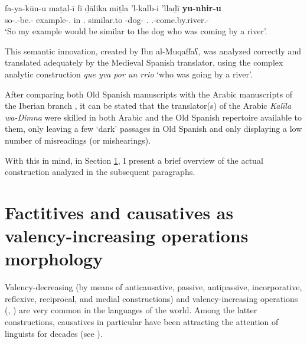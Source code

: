 \documentclass[output=paper]{langscibook}
\begin{document}
\begin{exe}
    \ex\label{doehla:ex:2}
    \gll fa-ya-kūn-u maṯal-ī fī ḏālika miṯla 'l-kalb-i 'llaḏī {\textbf{yu-nhir-u}\footnotemark[12]} \\
    so-\Third\SG.\M-be.\IPFV-\IND{} example-\POSS.\First\SG{} in \DEM.\DIST{} similar.to \Def-dog-\GEN{} \REL.\Third\SG{} \Third\SG.\M-come.by.river.\IPFV-\IND{} \\
    \glt ‘So my example would be similar to the dog who was coming 	by a river’. \citep[38]{cheikho_version_1905}
\end{exe}

\setcounter{footnote}{12}


This semantic innovation, created by Ibn al-Muqaffaʕ, was analyzed correctly and translated adequately by the Medieval Spanish translator, using the complex analytic construction \textit{que yva por un rrio} ‘who was going by a river’. 

After comparing both Old Spanish manuscripts with the Arabic manuscripts of the Iberian branch \citep{dohla_libro_2009}, it can be stated that the translator(s) of the Arabic \textit{Kalīla wa-Dimna} were skilled in both Arabic and the Old Spanish repertoire available to them, only leaving a few ‘dark’ passages in Old Spanish and only displaying a low number of misreadings (or mishearings). 

With this in mind, in Section \ref{dohla:sec:4}, I present a brief overview of the actual construction analyzed in the subsequent paragraphs.

\section{Factitives and causatives as valency-increasing operations morphology}\label{dohla:sec:4}
Valency-decreasing (by means of anticausative, passive, antipassive, incorporative, reflexive, reciprocal, and medial constructions) and valency-increasing operations (\citealt{comrie_causatives_1993,dixon_changing_2000, haspelmath_107_2004}, \citealt[175–222]{payne_describing_1997}) are very common in the languages of the world. Among the latter constructions, causatives in particular have been attracting the attention of linguists for decades (see \citealt{comrie_language_1989, lehmann_latin_2016, shibatani_grammar_1976, shibatani_causative_2002, song_causatives_1996,song_toward_2001}). 
\end{document}
